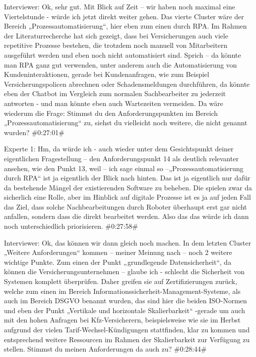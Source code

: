 Interviewer:
Ok, sehr gut. Mit Blick auf Zeit – wir haben noch maximal eine Viertelstunde - würde ich jetzt direkt weiter gehen. Das vierte Cluster wäre der Bereich „Prozessautomatisierung“, hier eben zum einen durch RPA. Im Rahmen der Literaturrecherche hat sich gezeigt, dass bei Versicherungen auch viele repetitive Prozesse bestehen, die trotzdem noch manuell von Mitarbeitern ausgeführt werden und eben noch nicht automatisiert sind. Sprich – da könnte man RPA ganz gut verwenden, unter anderem auch die Automatisierung von Kundeninteraktionen, gerade bei Kundenanfragen, wie zum Beispiel Versicherungspolicen abrechnen oder Schadensmeldungen durchführen, da könnte eben der Chatbot im Vergleich zum normalen Sachbearbeiter zu jederzeit antworten - und man könnte eben auch Wartezeiten vermeiden. Da wäre wiederum die Frage: Stimmst du den Anforderungspunkten im Bereich „Prozessautomatisierung“ zu, siehst du vielleicht noch weitere, die nicht genannt wurden?
\#0:27:01\#

Experte 1:
Hm, da würde ich - auch wieder unter dem Gesichtspunkt deiner eigentlichen Fragestellung – den Anforderungspunkt 14 als deutlich relevanter ansehen, wie den Punkt 13, weil – ich sage einmal so –„Prozessautomatisierung durch RPA“ ist ja eigentlich der Blick nach hinten. Das ist ja eigentlich nur dafür da bestehende Mängel der existierenden Software zu beheben. Die spielen zwar da sicherlich eine Rolle, aber im Hinblick auf digitale Prozesse ist es ja auf jeden Fall das Ziel, dass solche Nachbearbeitungen durch Roboter überhaupt erst gar nicht anfallen, sondern dass die direkt bearbeitet werden. Also das das würde ich dann noch unterschiedlich priorisieren.
\#0:27:58\#

Interviewer:
Ok, das können wir dann gleich noch machen. In dem letzten Cluster „Weitere Anforderungen“ kommen – meiner Meinung nach – noch 2 weitere wichtige Punkte. Zum einen der Punkt „grundlegende Datensicherheit“, da können die Versicherungsunternehmen – glaube ich - schlecht die Sicherheit von Systemen komplett überprüfen. Daher greifen sie auf Zertifizierungen zurück, welche zum einen im Bereich Informationssicherheit-Management-Systeme, als auch im Bereich DSGVO benannt wurden, das sind hier die beiden ISO-Normen und eben der Punkt „Vertikale und horizontale Skalierbarkeit“ -gerade um auch mit den hohen Anfragen bei Kfz-Versicherern, beispielsweise wie sie im Herbst aufgrund der vielen Tarif-Wechsel-Kündigungen stattfinden, klar zu kommen und entsprechend weitere Ressourcen im Rahmen der Skalierbarkeit zur Verfügung  zu stellen. Stimmst du meinen Anforderungen da auch zu? 
\#0:28:44\#

